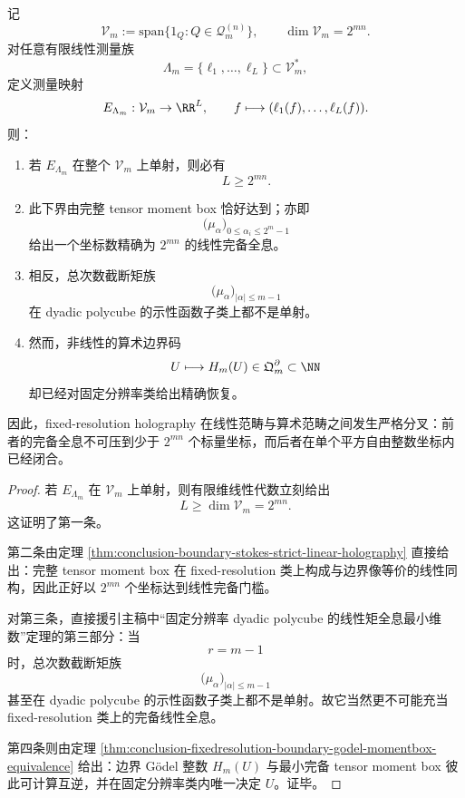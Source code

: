 \begin{theorem}\label{thm:conclusion-fixedresolution-linear-vs-nonlinear-holography-strict-bifurcation}
记
\[
\mathcal V_m:=\mathrm{span}\{1_{Q}:Q\in \mathcal Q_m^{(n)}\},
\qquad
\dim \mathcal V_m=2^{mn}.
\]
对任意有限线性测量族
\[
\Lambda_m=\{\ell_1,\dots,\ell_L\}\subset \mathcal V_m^\ast,
\]
定义测量映射
\[
E_{\Lambda_m}:\mathcal V_m\to \RR^L,
\qquad
f\longmapsto (\ell_1(f),\dots,\ell_L(f)).
\]
则：
\begin{enumerate}
  \item 若 \(E_{\Lambda_m}\) 在整个 \(\mathcal V_m\) 上单射，则必有
        \[
        L\ge 2^{mn}.
        \]
  \item 此下界由完整 tensor moment box 恰好达到；亦即
        \[
        \bigl(\mu_\alpha\bigr)_{0\le \alpha_i\le 2^m-1}
        \]
        给出一个坐标数精确为 \(2^{mn}\) 的线性完备全息。
  \item 相反，总次数截断矩族
        \[
        \bigl(\mu_\alpha\bigr)_{|\alpha|\le m-1}
        \]
        在 dyadic polycube 的示性函数子类上都不是单射。
  \item 然而，非线性的算术边界码
        \[
        U\longmapsto H_m(U)\in \mathfrak Q_m^\partial\subset \NN
        \]
        却已经对固定分辨率类给出精确恢复。
\end{enumerate}
因此，fixed-resolution holography 在线性范畴与算术范畴之间发生严格分叉：前者的完备全息不可压到少于 \(2^{mn}\) 个标量坐标，而后者在单个平方自由整数坐标内已经闭合。
\end{theorem}

\begin{proof}
若 \(E_{\Lambda_m}\) 在 \(\mathcal V_m\) 上单射，则有限维线性代数立刻给出
\[
L\ge \dim \mathcal V_m=2^{mn}.
\]
这证明了第一条。

第二条由定理 \ref{thm:conclusion-boundary-stokes-strict-linear-holography} 直接给出：完整 tensor moment box 在 fixed-resolution 类上构成与边界像等价的线性同构，因此正好以 \(2^{mn}\) 个坐标达到线性完备门槛。

对第三条，直接援引主稿中“固定分辨率 dyadic polycube 的线性矩全息最小维数”定理的第三部分：当
\[
r=m-1
\]
时，总次数截断矩族
\[
\bigl(\mu_\alpha\bigr)_{|\alpha|\le m-1}
\]
甚至在 dyadic polycube 的示性函数子类上都不是单射。故它当然更不可能充当 fixed-resolution 类上的完备线性全息。

第四条则由定理 \ref{thm:conclusion-fixedresolution-boundary-godel-momentbox-equivalence} 给出：边界 Gödel 整数 \(H_m(U)\) 与最小完备 tensor moment box 彼此可计算互逆，并在固定分辨率类内唯一决定 \(U\)。证毕。
\end{proof}

